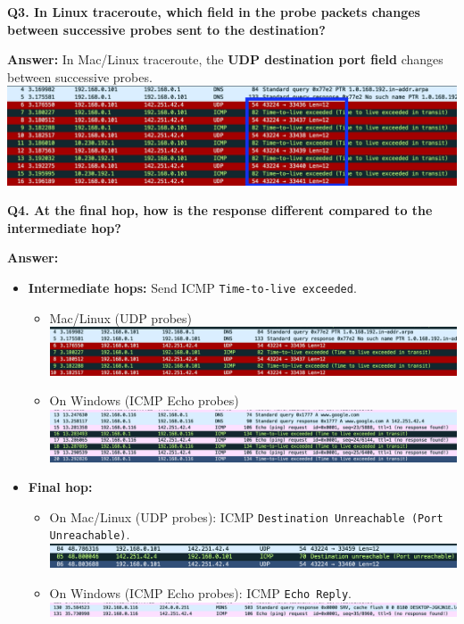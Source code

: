 \documentclass[12pt, a4paper]{report}
\begin{document}
\textbf{Q3. In Linux traceroute, which field in the probe packets changes between successive probes sent to the destination?}

\textbf{Answer:}  In Mac/Linux traceroute, the \textbf{UDP destination port field} changes between successive probes.  
\\
\includegraphics[width=1\linewidth]{images/image copy 2.png}

\textbf{Q4. At the final hop, how is the response different compared to the intermediate hop?}

\textbf{Answer:}  
\begin{itemize}[leftmargin=*]
    \item \textbf{Intermediate hops:} Send ICMP \texttt{Time-to-live exceeded}.
    \begin{itemize}
        \item Mac/Linux (UDP probes)
        \\
        \includegraphics[width=1\linewidth]{images/image copy.png}
        \\
        \item On Windows (ICMP Echo probes)
        \\
        \includegraphics[width=1\linewidth]{images/image.png}
    \end{itemize}
    \item \textbf{Final hop:}  
    \begin{itemize}
        \item On Mac/Linux (UDP probes): ICMP \texttt{Destination Unreachable (Port Unreachable)}.
        \\
        \includegraphics[width=1\linewidth]{images/image copy 3.png}
        \\
        \item On Windows (ICMP Echo probes): ICMP \texttt{Echo Reply}.
        \\
        \includegraphics[width=1\linewidth]{images/image copy 4.png}
    \end{itemize}
\end{itemize}
\end{document}
